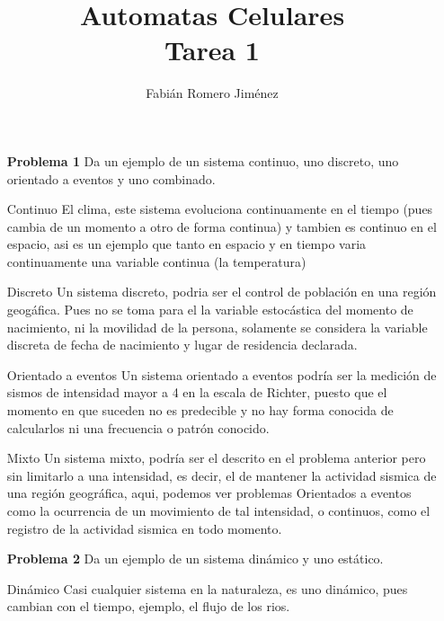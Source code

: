 \documentclass{article}
\title{Automatas Celulares \\ Tarea 1}
\author{Fabián Romero Jiménez}
\begin{document}
\maketitle

\begin{enumerate}

\item[\bf{Problema 1}] Da un ejemplo de un sistema continuo, uno discreto, uno orientado a eventos y uno combinado.\\

\item[{Continuo}] El clima, este sistema evoluciona continuamente en el tiempo (pues cambia de un momento a otro de forma continua) y tambien es continuo en el espacio, asi es un ejemplo que tanto en espacio y en tiempo varia continuamente una variable continua (la temperatura)\\

\item[{Discreto}] Un sistema discreto, podria ser el control de población en una región geogáfica. Pues no se toma para el la variable estocástica del momento de nacimiento, ni la movilidad de la persona, solamente se considera la variable discreta de fecha de nacimiento y lugar de residencia declarada.\\

\item[{Orientado a eventos}] Un sistema orientado a eventos podría ser la medición de sismos de intensidad mayor a 4 en la escala de Richter, puesto que el momento en que suceden no es predecible y no hay forma conocida de calcularlos ni una frecuencia o patrón conocido.\\

\item[{Mixto}] Un sistema mixto, podría ser el descrito en el problema anterior pero sin limitarlo a una intensidad, es decir, el de mantener la actividad sismica de una región geográfica, aqui, podemos ver problemas Orientados a eventos como la ocurrencia de un movimiento de tal intensidad, o continuos, como el registro de la actividad sismica en todo momento.\\


\item[\bf{Problema 2}] Da un ejemplo de un sistema dinámico y uno estático.\\

\item[{Dinámico}]  Casi cualquier sistema en la naturaleza, es uno dinámico, pues cambian con el tiempo, ejemplo, el flujo de los rios.\\


\end{enumerate}
\end{document}
